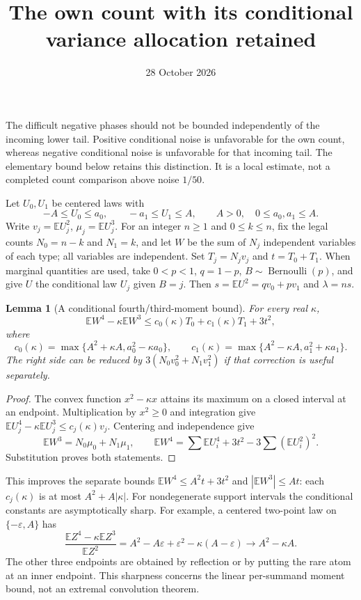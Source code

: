 \documentclass[11pt]{article}
\title{The own count with its conditional variance allocation retained}
\author{}
\date{28 October 2026}
\newtheorem{lemma}{Lemma}
\newcommand{\E}{\mathbb E}
\begin{document}
\maketitle

The difficult negative phases should not be bounded independently of the
incoming lower tail. Positive conditional noise is unfavorable for the
own count, whereas negative conditional noise is unfavorable for that
incoming tail. The elementary bound below retains this distinction. It
is a local estimate, not a completed count comparison above noise $1/50$.

Let $U_0,U_1$ be centered laws with
\[
 -A\le U_0\le a_0,\qquad -a_1\le U_1\le A,
 \qquad A>0,\quad 0\le a_0,a_1\le A.
\]
Write $v_j=\E U_j^2$, $\mu_j=\E U_j^3$. For an integer $n\ge1$ and
$0\le k\le n$, fix the legal counts
$N_0=n-k$ and $N_1=k$, and let $W$ be the sum of $N_j$ independent
variables of each type; all variables are independent. Set
$T_j=N_jv_j$ and $t=T_0+T_1$.
When marginal quantities are used, take $0<p<1$, $q=1-p$,
$B\sim\operatorname{Bernoulli}(p)$, and give $U$ the conditional law
$U_j$ given $B=j$. Then $s=\E U^2=qv_0+pv_1$ and $\lambda=ns$.

\begin{lemma}[A conditional fourth/third-moment bound]
\label{own:moment}
For every real $\kappa$,
\[
 \E W^4-\kappa\E W^3
 \le c_0(\kappa)T_0+c_1(\kappa)T_1+3t^2,
\]
where
\[
 c_0(\kappa)=\max\{A^2+\kappa A,a_0^2-\kappa a_0\},\qquad
 c_1(\kappa)=\max\{A^2-\kappa A,a_1^2+\kappa a_1\}.
\]
The right side can be reduced by $3(N_0v_0^2+N_1v_1^2)$ if that
correction is useful separately.
\end{lemma}
\begin{proof}
The convex function $x^2-\kappa x$ attains its maximum on a closed
interval at an endpoint. Multiplication by $x^2\ge0$ and integration
give $\E U_j^4-\kappa\E U_j^3\le c_j(\kappa)v_j$.
Centering and independence give
\[
 \E W^3=N_0\mu_0+N_1\mu_1,\qquad
 \E W^4=\sum\E U_i^4+3t^2-3\sum(\E U_i^2)^2.
\]
Substitution proves both statements.
\end{proof}

This improves the separate bounds $\E W^4\le A^2t+3t^2$ and
$|\E W^3|\le At$: each $c_j(\kappa)$ is at most
$A^2+A|\kappa|$. For nondegenerate support intervals the conditional
constants are asymptotically sharp.
For example, a centered two-point law on $\{-\varepsilon,A\}$ has
\[
 \frac{\E Z^4-\kappa\E Z^3}{\E Z^2}
 =A^2-A\varepsilon+\varepsilon^2-\kappa(A-\varepsilon)
 \longrightarrow A^2-\kappa A.
\]
The other three endpoints are obtained by reflection or by putting the
rare atom at an inner endpoint. This sharpness concerns the linear
per-summand moment bound, not an extremal convolution theorem.
\end{document}
